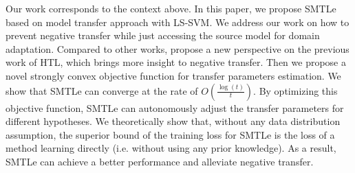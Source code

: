 Our work corresponds to the context above. In this paper, we propose SMTLe based on model transfer approach with LS-SVM. We address our work on how to prevent negative transfer while just accessing the source model for domain adaptation. Compared to other works, propose a new perspective on the previous work of HTL, which brings more insight to negative transfer. Then we propose a novel strongly convex objective function for transfer parameters estimation. We show that SMTLe can converge at the rate of $O(\frac{\log(t)}{t})$. 
By optimizing this objective function, SMTLe can autonomously adjust the transfer parameters for different hypotheses. We theoretically show that, without any data distribution assumption, the superior bound of the training loss for SMTLe is the loss of a method learning directly (i.e. without using any prior knowledge). As a result, SMTLe can achieve a better performance and alleviate negative transfer.
